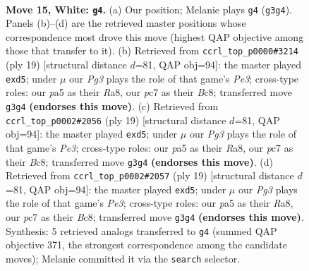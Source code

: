 \documentclass[11pt]{article}
\begin{document}
\clearpage

\begin{figure}[p]\centering
\begin{subfigure}{0.46\textwidth}\centering
\resizebox{\linewidth}{!}{%
\newchessgame
\chessboard[
  setfen={r1b1k2r/2p1qp2/2n2np1/p2p4/1p1P3p/5NPP/PPK1PP2/R2QBB1R w kq - 0 15},
  showmover=false,
  pgfstyle=straightmove, color=movearrow, markmove={g3-g4}
]}
\caption{}
\end{subfigure}\hfill
\begin{subfigure}{0.46\textwidth}\centering
\resizebox{\linewidth}{!}{%
\newchessgame
\chessboard[
  setfen={r1b1kb1r/1p1n1p2/2p1pqpp/p2P4/3P4/1QNBPN2/PP3PPP/R3K2R b KQkq - 0 10},
  showmover=false,
  pgfstyle=straightmove, color=movearrow, markmove={e6-d5}
]}
\caption{}
\end{subfigure}
\\[4pt]
\begin{subfigure}{0.46\textwidth}\centering
\resizebox{\linewidth}{!}{%
\newchessgame
\chessboard[
  setfen={r1b1kb1r/1p1n1p2/2p1pqpp/p2P4/3P4/1QNBPN2/PP3PPP/R3K2R b KQkq - 0 10},
  showmover=false,
  pgfstyle=straightmove, color=movearrow, markmove={e6-d5}
]}
\caption{}
\end{subfigure}\hfill
\begin{subfigure}{0.46\textwidth}\centering
\resizebox{\linewidth}{!}{%
\newchessgame
\chessboard[
  setfen={r1b1kb1r/1p1n1p2/2p1pqpp/p2P4/3P4/1QNBPN2/PP3PPP/R3K2R b KQkq - 0 10},
  showmover=false,
  pgfstyle=straightmove, color=movearrow, markmove={e6-d5}
]}
\caption{}
\end{subfigure}
\caption{\textbf{Move 15, White: \texttt{g4}.} (a) Our position; Melanie plays \texttt{g4} (\texttt{g3g4}). Panels (b)--(d) are the retrieved master positions whose correspondence most drove this move (highest QAP objective among those that transfer to it). (b) Retrieved from \texttt{ccrl\_top\_p0000\#3214} (ply 19) [structural distance $d$=81, QAP obj=94]: the master played \texttt{exd5}; under $\mu$ our \emph{Pg3} plays the role of that game's \emph{Pe3}; cross-type roles: our \emph{p}a5 as their \emph{R}a8, our \emph{p}c7 as their \emph{B}c8; transferred move \texttt{g3g4} \textbf{(endorses this move)}. (c) Retrieved from \texttt{ccrl\_top\_p0002\#2056} (ply 19) [structural distance $d$=81, QAP obj=94]: the master played \texttt{exd5}; under $\mu$ our \emph{Pg3} plays the role of that game's \emph{Pe3}; cross-type roles: our \emph{p}a5 as their \emph{R}a8, our \emph{p}c7 as their \emph{B}c8; transferred move \texttt{g3g4} \textbf{(endorses this move)}. (d) Retrieved from \texttt{ccrl\_top\_p0002\#2057} (ply 19) [structural distance $d$=81, QAP obj=94]: the master played \texttt{exd5}; under $\mu$ our \emph{Pg3} plays the role of that game's \emph{Pe3}; cross-type roles: our \emph{p}a5 as their \emph{R}a8, our \emph{p}c7 as their \emph{B}c8; transferred move \texttt{g3g4} \textbf{(endorses this move)}. Synthesis: 5 retrieved analogs transferred to \texttt{g4} (summed QAP objective 371, the strongest correspondence among the candidate moves); Melanie committed it via the \texttt{search} selector.}
\label{fig:thought-m28}
\end{figure}
\end{document}
